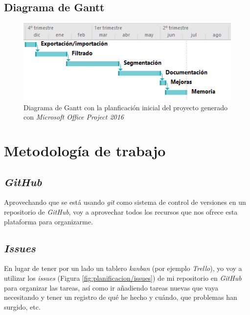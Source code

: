 \subsection{Diagrama de Gantt}

\begin{figure}[H]
	\centering
	\includegraphics[width=12cm]{imagenes/planificacion/gantt}
	\caption{Diagrama de Gantt con la planficación inicial del proyecto generado con \textit{Microsoft Office Project 2016}}
	\label{fig:planificacion/gantt}
\end{figure}


\section{Metodología de trabajo}

\subsection{\textit{GitHub}}

Aprovechando que se está usando \textit{git} como sistema de control de versiones en un repositorio de \textit{GitHub}, voy a aprovechar todos los recursos que nos ofrece esta plataforma para organizarme. 

\subsection{\textit{Issues}}

En lugar de tener por un lado un tablero \textit{kanban} (por ejemplo \textit{Trello}), yo voy a utilizar los \textit{issues} (Figura \ref{fig:planificacion/issues}) de mi repositorio en \textit{GitHub} para organizar las tareas, así como ir añadiendo tareas nuevas que vaya necesitando y tener un registro de qué he hecho y cuándo, que problemas han surgido, etc.

